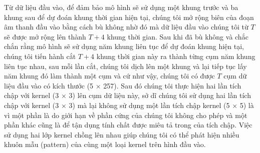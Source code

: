 			Từ dữ liệu đầu vào, để đảm bảo mô hình sẽ sử dụng một khung trước và ba khung sau để dự đoán khung thời gian hiện tại, chúng tôi mở rộng biên của đoạn âm thanh đầu vào bằng cách bù không nhờ đó mà dữ liệu đầu vào chúng tôi từ $T$ sẽ được mở rộng lên thành $T + 4$ khung thời gian. Sau khi đã bù không và chắc chắn rằng mô hình sẽ sử dụng năm khung liên tục để dự đoán khung hiện tại, chúng tôi tiến hành cắt $T + 4$ khung thời gian này ra thành từng cụm năm khung liên tục nhau, sau mỗi lần cắt, chúng tôi dịch lên một khung và lại tiếp tục lấy năm khung đó làm thành một cụm và cứ như vậy, chúng tôi có được $T$ cụm dữ liệu đầu vào có kích thước (5 $\times$ 257). Sau đó chúng tôi thực hiện hai lần tích chập với kernel (3 $\times$ 3) lên cụm dữ liệu này, sở dĩ chúng tôi sử dụng hai lần tích chập với kernel (3 $\times$ 3) mà lại không sử dụng một lần tích chập kernel (5 $\times$ 5) là vì một phần là do giới hạn về phần cứng của chúng tôi không cho phép và một phần khác cũng là để tận dụng tính chất được miêu tả trong  của tích chập. Việc sử dụng hai lớp kernel chồng lên nhau giúp chúng tôi có thể phát hiện nhiều khuôn mẫu (pattern) của cùng một loại kernel trên hình đầu vào.
				
